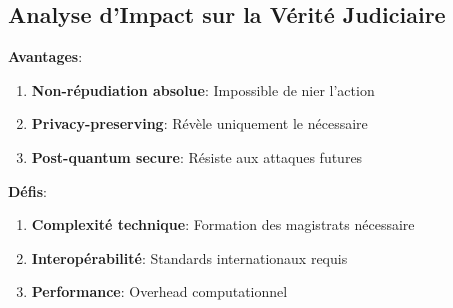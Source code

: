 \subsection{Analyse d'Impact sur la Vérité Judiciaire}
\textbf{Avantages}:

\begin{enumerate}
\item \textbf{Non-répudiation absolue}: Impossible de nier l'action
\item \textbf{Privacy-preserving}: Révèle uniquement le nécessaire
\item \textbf{Post-quantum secure}: Résiste aux attaques futures
\end{enumerate}

\textbf{Défis}:

\begin{enumerate}
\item \textbf{Complexité technique}: Formation des magistrats nécessaire
\item \textbf{Interopérabilité}: Standards internationaux requis
\item \textbf{Performance}: Overhead computationnel
\end{enumerate}